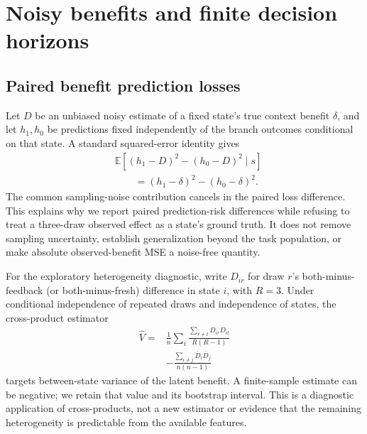 \documentclass[10pt,twocolumn]{article}
\begin{document}
\begin{table}[!ht]
\centering\small
\caption{Paired state-minus-control utility on MBPP+ at the \$0.01 ceiling,
original draws 0 and 1. Units are USD $\times1{,}000$ per failed task.
Only the feedback comparison is primary; escalation is an added diagnostic.}
\label{tab:all-policy-comparisons}

\end{table}

\begin{table}[!ht]
\centering\small
\caption{All eight fixed actions on MBPP+ at the \$0.01 ceiling. Cost and
utility are USD $\times1{,}000$ per failed task, including producer cost.
These target outcomes do not select the source-frozen static baseline.}
\label{tab:all-fixed}

\end{table}

\clearpage
\twocolumn
\section{Noisy benefits and finite decision horizons}

\subsection{Paired benefit prediction losses}

Let $D$ be an unbiased noisy estimate of a fixed state's true context benefit
$\delta$, and let $h_1,h_0$ be predictions fixed independently of the branch
outcomes conditional on that state. A standard squared-error identity gives
\begin{align*}
 &\mathbb E[(h_1-D)^2-(h_0-D)^2\mid s]\\
 &\qquad=(h_1-\delta)^2-(h_0-\delta)^2.
\end{align*}
The common sampling-noise contribution cancels in the paired loss difference.
This explains why we report paired prediction-risk differences while refusing
to treat a three-draw observed effect as a state's ground truth. It does not
remove sampling uncertainty, establish generalization beyond the task
population, or make absolute observed-benefit MSE a noise-free quantity.

For the exploratory heterogeneity diagnostic, write $D_{ir}$ for draw $r$'s
both-minus-feedback (or both-minus-fresh) difference in state $i$, with $R=3$.
Under conditional independence of repeated draws and independence of states,
the cross-product estimator
\begin{align*}
\widehat V={}&\frac1n\sum_i\frac{\sum_{r\ne t}D_{ir}D_{it}}{R(R-1)}\\
 &-\frac{\sum_{i\ne j}\overline D_i\overline D_j}{n(n-1)}
\end{align*}
targets between-state variance of the latent benefit. A finite-sample estimate
can be negative; we retain that value and its bootstrap interval. This is a
diagnostic application of cross-products, not a new estimator or evidence that
the remaining heterogeneity is predictable from the available features.
\end{document}
